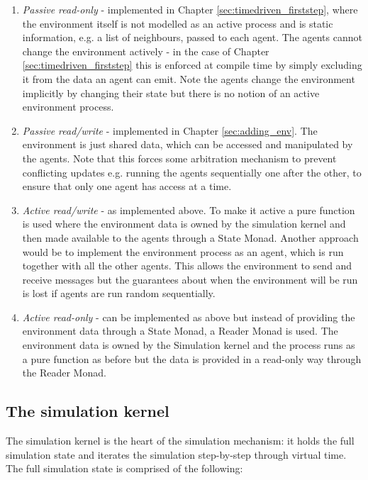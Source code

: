 \begin{enumerate}
	\item \textit{Passive read-only} - implemented in Chapter \ref{sec:timedriven_firststep}, where the environment itself is not modelled as an active process and is static information, e.g. a list of neighbours, passed to each agent. The agents cannot change the environment actively - in the case of Chapter \ref{sec:timedriven_firststep} this is enforced at compile time by simply excluding it from the data an agent can emit. Note the agents change the environment implicitly by changing their state but there is no notion of an active environment process.
	
	\item \textit{Passive read/write} - implemented in Chapter \ref{sec:adding_env}. The environment is just shared data, which can be accessed and manipulated by the agents. Note that this forces some arbitration mechanism to prevent conflicting updates e.g. running the agents sequentially one after the other, to ensure that only one agent has access at a time.
	
	\item \textit{Active read/write} - as implemented above. To make it active a pure function is used where the environment data is owned by the simulation kernel and then made available to the agents through a State Monad. Another approach would be to implement the environment process as an agent, which is run together with all the other agents. This allows the environment to send and receive messages but the guarantees about when the environment will be run is lost if agents are run random sequentially.
	
	\item \textit{Active read-only} - can be implemented as above but instead of providing the environment data through a State Monad, a Reader Monad is used. The environment data is owned by the Simulation kernel and the process runs as a pure function as before but the data is provided in a read-only way through the Reader Monad.
\end{enumerate}

\subsection{The simulation kernel}
The simulation kernel is the heart of the simulation mechanism: it holds the full simulation state and iterates the simulation step-by-step through virtual time. The full simulation state is comprised of the following: 

